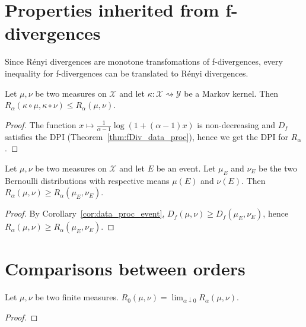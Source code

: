 \section{Properties inherited from f-divergences}

Since Rényi divergences are monotone transfomations of f-divergences, every inequality for f-divergences can be translated to Rényi divergences.

\begin{theorem}
  \label{thm:renyi_data_proc}
  Let $\mu, \nu$ be two measures on $\mathcal X$ and let $\kappa : \mathcal X \rightsquigarrow \mathcal Y$ be a Markov kernel.
  Then $R_\alpha(\kappa \circ \mu, \kappa \circ \nu) \le R_\alpha(\mu, \nu)$.
\end{theorem}

\begin{proof}
The function $x \mapsto \frac{1}{\alpha - 1}\log (1 + (\alpha - 1)x)$ is non-decreasing and $D_f$ satisfies the DPI (Theorem~\ref{thm:fDiv_data_proc}), hence we get the DPI for $R_\alpha$.
\end{proof}

\begin{lemma}
  \label{lem:renyi_data_proc_event}
  Let $\mu, \nu$ be two measures on $\mathcal X$ and let $E$ be an event. Let $\mu_E$ and $\nu_E$ be the two Bernoulli distributions with respective means $\mu(E)$ and $\nu(E)$.
  Then $R_\alpha(\mu, \nu) \ge R_\alpha(\mu_E, \nu_E)$.
\end{lemma}

\begin{proof}
By Corollary~\ref{cor:data_proc_event}, $D_f(\mu, \nu) \ge D_f(\mu_E, \nu_E)$, hence $R_\alpha(\mu, \nu) \ge R_\alpha(\mu_E, \nu_E)$.
\end{proof}

\section{Comparisons between orders}

\begin{lemma}
  \label{lem:renyi_tendsto_renyi_zero}
  Let $\mu, \nu$ be two finite measures. $R_0(\mu, \nu) = \lim_{\alpha \downarrow 0} R_\alpha(\mu, \nu)$.
\end{lemma}

\begin{proof}
\end{proof}

